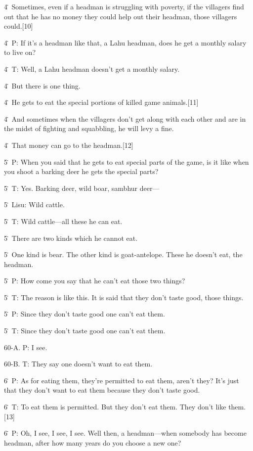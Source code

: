 {4\. Sometimes, even if a headman is struggling with poverty, if the villagers
find out that he has no money they could help out their headman, those villagers
could.[10]}

{4\. P: If it's a headman like that, a Lahu headman, does he get a monthly
salary to live on?}

{4\. T: Well, a Lahu headman doesn't get a monthly salary.}

{4\. But there is one thing.}

{4\. He gets to eat the special portions of killed game animals.[11]}

{4\. And sometimes when the villagers don't get along with each other and
are in the midst of fighting and squabbling, he will levy a fine.}

{4\. That money can go to the headman.[12]}

{5\. P: When you said that he gets to eat special parts of the game, is
it like when you shoot a barking deer he gets the special parts?}

{5\. T: Yes. Barking deer, wild boar, sambhur deer---}

{5\. Lisu: Wild cattle.}

{5\. T: Wild cattle---all these he can eat.}

{5\. There are two kinds which he cannot eat.}

{5\. One kind is bear. The other kind is goat-antelope. These he doesn't
eat, the headman.}

{5\. P: How come you say that he can't eat those two things?}

{5\. T: The reason is like this. It is said that they don't taste good,
those things.}

{5\. P: Since they don't taste good one can't eat them.}

{5\. T: Since they don't taste good one can't eat them.}

{60-A. P: I see.}

{60-B. T: They say one doesn't want to eat them.}

{6\. P: As for eating them, they're permitted to eat them, aren't they?
It's just that they don't want to eat them because they don't taste good.}

{6\. T: To eat them is permitted. But they don't eat them. They don't like
them.[13]}

{6\. P: Oh, I see, I see, I see. Well then, a headman---when somebody has
become headman, after how many years do you choose a new one?}

